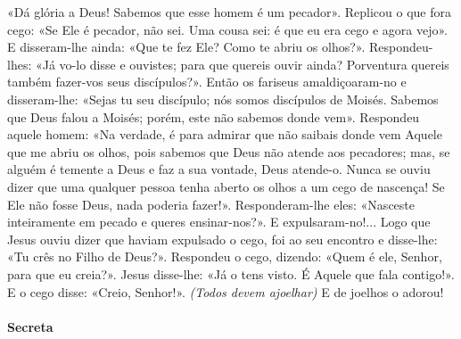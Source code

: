 \begin{paracol}{2}
{«Dá glória a Deus! Sabemos que esse homem é um pecador». Replicou o que fora cego: «Se Ele é pecador, não sei. Uma cousa sei: é que eu era cego e agora vejo». E disseram-lhe ainda: «Que te fez Ele? Como te abriu os olhos?». Respondeu-lhes: «Já vo-lo disse e ouvistes; para que quereis ouvir ainda? Porventura quereis também fazer-vos seus discípulos?». Então os fariseus amaldiçoaram-no e disseram-lhe: «Sejas tu seu discípulo; nós somos discípulos de Moisés. Sabemos que Deus falou a Moisés; porém, este não sabemos donde vem». Respondeu aquele homem: «Na verdade, é para admirar que não saibais donde vem Aquele que me abriu os olhos, pois sabemos que Deus não atende aos pecadores; mas, se alguém é temente a Deus e faz a sua vontade, Deus atende-o. Nunca se ouviu dizer que uma qualquer pessoa tenha aberto os olhos a um cego de nascença! Se Ele não fosse Deus, nada poderia fazer!». Responderam-lhe eles: «Nasceste inteiramente em pecado e queres ensinar-nos?». E expulsaram-no!... Logo que Jesus ouviu dizer que haviam expulsado o cego, foi ao seu encontro e disse-lhe: «Tu crês no Filho de Deus?». Respondeu o cego, dizendo: «Quem é ele, Senhor, para que eu creia?». Jesus disse-lhe: «Já o tens visto. É Aquele que fala contigo!». E o cego disse: «Creio, Senhor!». \emph{(Todos devem ajoelhar)} E de joelhos o adorou!
}\end{paracol}

\begin{paracol}{2}\switchcolumn{}\end{paracol}

\paragraph{Secreta}
\begin{paracol}{2}\switchcolumn{}\end{paracol}

